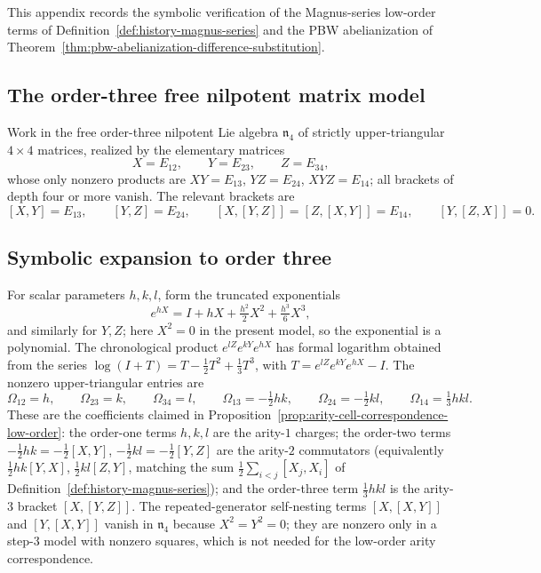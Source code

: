 
This appendix records the symbolic verification of the Magnus-series low-order
terms of Definition~\ref{def:history-magnus-series} and the PBW abelianization
of Theorem~\ref{thm:pbw-abelianization-difference-substitution}.

\subsection{The order-three free nilpotent matrix model}

Work in the free order-three nilpotent Lie algebra $\mathfrak n_4$ of strictly
upper-triangular $4\times4$ matrices, realized by the elementary matrices
\[
  X=E_{12},\qquad Y=E_{23},\qquad Z=E_{34},
\]
whose only nonzero products are $XY=E_{13}$, $YZ=E_{24}$, $XYZ=E_{14}$; all
brackets of depth four or more vanish.  The relevant brackets are
\[
  [X,Y]=E_{13},\qquad [Y,Z]=E_{24},\qquad [X,[Y,Z]]=[Z,[X,Y]]=E_{14},\qquad
  [Y,[Z,X]]=0 .
\]

\subsection{Symbolic expansion to order three}

For scalar parameters $h,k,l$, form the truncated exponentials
\[
  e^{hX}=I+hX+\tfrac{h^2}{2}X^2+\tfrac{h^3}{6}X^3,
\]
and similarly for $Y,Z$; here $X^2=0$ in the present model, so the exponential
is a polynomial.  The chronological product $e^{lZ}e^{kY}e^{hX}$ has formal
logarithm obtained from the series $\log(I+T)=T-\tfrac12T^2+\tfrac13T^3$, with
$T=e^{lZ}e^{kY}e^{hX}-I$.  The nonzero upper-triangular entries are
\[
  \Omega_{12}=h,\qquad
  \Omega_{23}=k,\qquad
  \Omega_{34}=l,\qquad
  \Omega_{13}=-\tfrac12hk,\qquad
  \Omega_{24}=-\tfrac12kl,\qquad
  \Omega_{14}=\tfrac13hkl .
\]
These are the coefficients claimed in
Proposition~\ref{prop:arity-cell-correspondence-low-order}: the order-one terms
$h,k,l$ are the arity-$1$ charges; the order-two terms
$-\tfrac12hk=-\tfrac12[X,Y]$, $-\tfrac12kl=-\tfrac12[Y,Z]$ are the arity-$2$
commutators (equivalently $\tfrac12hk[Y,X]$, $\tfrac12kl[Z,Y]$, matching the
sum $\tfrac12\sum_{i<j}[X_j,X_i]$ of
Definition~\ref{def:history-magnus-series}); and the order-three term
$\tfrac13hkl$ is the arity-$3$ bracket $[X,[Y,Z]]$.  The repeated-generator
self-nesting terms $[X,[X,Y]]$ and $[Y,[X,Y]]$ vanish in $\mathfrak n_4$ because
$X^2=Y^2=0$; they are nonzero only in a step-$3$ model with nonzero squares,
which is not needed for the low-order arity correspondence.

